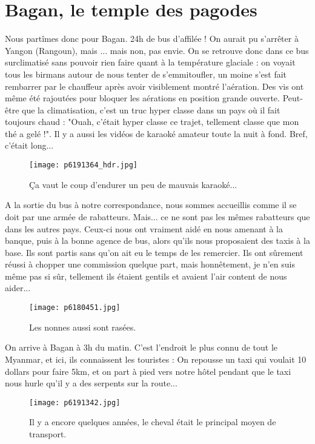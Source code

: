 \documentclass{book}
\begin{document}
\chapter{Bagan, le temple des pagodes}
Nous partîmes donc pour Bagan. 24h de bus d'affilée ! On aurait pu s'arrêter à Yangon (Rangoun), mais ... mais non, pas envie. On se retrouve donc dans ce bus surclimatisé sans pouvoir rien faire quant à la température glaciale : on voyait tous les birmans autour de nous tenter de s'emmitoufler, un moine s'est fait rembarrer par le chauffeur après avoir visiblement montré l'aération. Des vis ont même été rajoutées pour bloquer les aérations en position grande ouverte. Peut-être que la climatisation, c'est un truc hyper classe dans un pays où il fait toujours chaud : "Ouah, c'était hyper classe ce trajet, tellement classe que mon thé a gelé !". Il y a aussi les vidéos de karaoké amateur toute la nuit à fond. Bref, c'était long...


\begin{figure}[h]
\centering
\texttt{[image: p6191364\_hdr.jpg]}
\caption*{Ça vaut le coup d'endurer un peu de mauvais karaoké...}
\end{figure}

A la sortie du bus à notre correspondance, nous sommes accueillis comme il se doit par une armée de rabatteurs. Mais... ce ne sont pas les mêmes rabatteurs que dans les autres pays. Ceux-ci nous ont vraiment aidé en nous amenant à la banque, puis à la bonne agence de bus, alors qu'ils nous proposaient des taxis à la base. Ils sont partis sans qu'on ait eu le temps de les remercier. Ils ont sûrement réussi à chopper une commission quelque part, mais honnêtement, je n'en suis même pas si sûr, tellement ils étaient gentils et avaient l'air content de nous aider...


\begin{figure}[h]
\centering
\texttt{[image: p6180451.jpg]}
\caption*{Les nonnes aussi sont rasées.}
\end{figure}

On arrive à Bagan à 3h du matin. C'est l'endroit le plus connu de tout le Myanmar, et ici, ils connaissent les touristes : On repousse un taxi qui voulait 10 dollars pour faire 5km, et on part à pied vers notre hôtel pendant que le taxi nous hurle qu'il y a des serpents sur la route...


\begin{figure}[h]
\centering
\texttt{[image: p6191342.jpg]}
\caption*{Il y a encore quelques années, le cheval était le principal moyen de transport.}
\end{figure}
\end{document}
